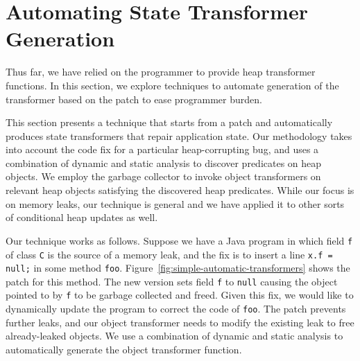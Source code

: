 \section{Automating State Transformer Generation}
\label{sec:automate}

Thus far, we have relied on the programmer to provide heap transformer
functions. In this section, we explore techniques to automate generation of
the transformer based on the patch to ease programmer burden.

This section presents a technique that starts from a patch and
automatically produces state transformers that repair application state.
Our methodology takes into account the code fix for a particular
heap-corrupting bug, and uses a combination of dynamic and static analysis
to discover predicates on heap objects.
We employ the garbage collector to invoke object transformers on relevant
heap objects satisfying the discovered heap predicates. While our focus is
on memory leaks, our technique is general and we have applied it to other
sorts of conditional heap updates as well.

Our technique works as follows. Suppose we have a Java program in which
field \texttt{f} of class \texttt{C} is the source of a memory leak, and
the fix is to insert a line \texttt{x.f = null;} in some method
\texttt{foo}. Figure~\ref{fig:simple-automatic-transformers} shows the
patch for this method. The new version sets field {\tt f} to {\tt null}
causing the object pointed to by {\tt f} to be garbage collected and freed.
Given this fix, we would like to dynamically update the program to correct
the code of \texttt{foo}. The patch prevents further leaks, and our
object transformer needs to modify the existing leak to free already-leaked
objects. We use a combination of dynamic and static analysis to
automatically generate the object transformer function.




